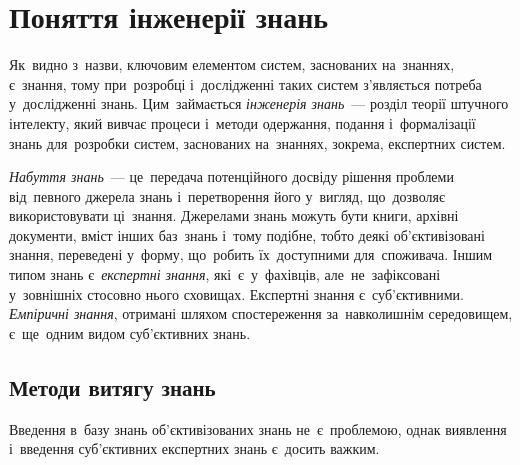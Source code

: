 \documentclass[
  a4paper,
  oneside,
  BCOR = 10mm,
  DIV = 12,
  12pt,
  headings = normal,
]{scrartcl}
\begin{document}
  \section{Поняття інженерії знань}
    Як~видно з~назви, ключовим елементом систем, заснованих на~знаннях, є~знання, тому при~розробці і~дослідженні таких систем з'являється потреба у~дослідженні знань. Цим~займається \emph{інженерія знань}~— розділ теорії штучного інтелекту, який вивчає процеси і~методи одержання, подання і~формалізації знань для~розробки систем, заснованих на~знаннях, зокрема, експертних систем.

    \emph{Набуття знань}~— це~передача потенційного досвіду рішення проблеми від~певного джерела знань і~перетворення його у~вигляд, що~дозволяє використовувати ці~знання.  Джерелами знань можуть бути книги, архівні документи, вміст інших баз~знань і~тому подібне, тобто деякі об'єктивізовані знання, переведені у~форму, що~робить їх~доступними для~споживача. Іншим типом знань є~\emph{експертні знання}, які~є~у~фахівців, але~не~зафіксовані у~зовнішніх стосовно нього сховищах. Експертні знання є~суб'єктивними. \emph{Емпіричні знання}, отримані шляхом спостереження за~навколишнім середовищем, є~ще~одним видом суб'єктивних знань.

    \subsection{Методи витягу знань}
      Введення в~базу знань об'єктивізованих знань не~є~проблемою, однак виявлення і~введення суб'єктивних експертних знань є~досить важким.
\end{document}
